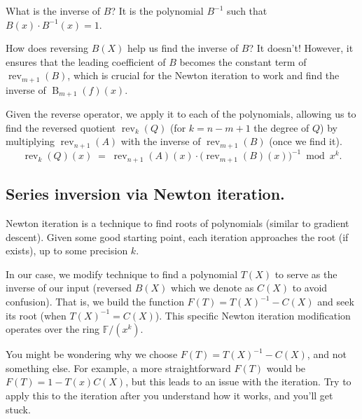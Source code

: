 What is the inverse of $B$? It is the polynomial $B^{-1}$ such that $B(x) \cdot B^{-1}(x) = 1$.
\begin{notice}
  How does reversing $B(X)$ help us find the inverse of $B$? It doesn't! However,
  it ensures that the leading coefficient of $B$ becomes the constant term of $\operatorname{rev}_{m+1}(B)$, which is crucial for the Newton iteration to work and  find the inverse of $\operatorname{B}_{m+1}(f)(x)$. 
\end{notice}

Given the reverse operator, we apply it to each of the polynomials, allowing us to find the reversed quotient $\operatorname{rev}_k(Q)$ (for $k=n-m+1$ the degree of $Q$) by multiplying $\operatorname{rev}_{n+1}(A)$ with the inverse of $\operatorname{rev}_{m+1}(B)$ (once we find it).
\[
\operatorname{rev}_k(Q)(x) \;=\; \operatorname{rev}_{n+1}(A)(x) \cdot
   \bigl( \operatorname{rev}_{m+1}(B)(x) \bigr)^{-1} \bmod x^k.
\]



\subsection{Series inversion via Newton iteration.}
Newton iteration is a technique to find roots of polynomials (similar to gradient descent). 
Given some good starting point, each iteration approaches the root (if exists), up to some precision $k$.

In our case, we modify technique to find a polynomial $T(X)$ to serve as the inverse of our input (reversed $B(X)$ which we denote as $C(X)$ to avoid confusion).
That is, we build the function $F(T)=T(X)^{-1}-C(X)$ and seek its root (when $T(X)^{-1}=C(X)$).
This specific Newton iteration modification operates over the ring $\mathbb{F}/(x^k)$.
\begin{notice}
    You might be wondering why we choose $F(T)=T(X)^{-1}-C(X)$, and not something else. 
    For example, a more straightforward $F(T)$ would be $F(T)=1-T(x)C(X)$, but this leads to 
    an issue with the iteration. Try to apply this to the iteration after you understand how it works, and you'll get stuck.
\end{notice}

